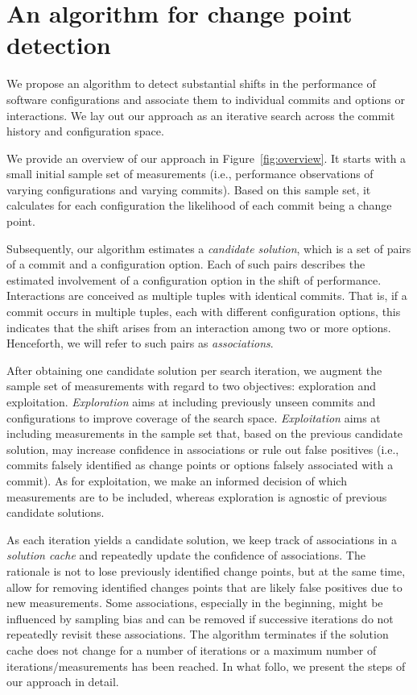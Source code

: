 \documentclass[sigconf, screen]{acmart}
\begin{document}
	\section{An algorithm for change point detection}\label{sec:cpmodel}
	We propose an algorithm to detect substantial shifts in the performance of software configurations and associate them to individual commits and options or interactions. We lay out our approach as an iterative search across the commit history and configuration space. 
	
	We provide an overview of our approach in Figure~\ref{fig:overview}. 
	It starts with a small initial sample set of measurements (i.e., performance observations of varying configurations and varying commits). 
	Based on this sample set, it calculates for each configuration the likelihood of each commit being a change point. 
	
	Subsequently, our algorithm estimates a \emph{candidate solution}, which is a set of pairs of a commit and a configuration option. 
	Each of such pairs describes the estimated involvement of a configuration option in the shift of performance. 
	Interactions are conceived as multiple tuples with identical commits. That is, if a commit occurs in multiple tuples, each with different configuration options, this indicates that the shift arises from an interaction among two or more options. 
	Henceforth, we will refer to such pairs as \emph{associations}.
	
	After obtaining one candidate solution per search iteration, we augment the sample set of measurements with regard to two objectives: exploration and exploitation. 
	\emph{Exploration} aims at including previously unseen commits and configurations to improve coverage of the search space. 
	\emph{Exploitation} aims at including measurements in the sample set that, based on the previous candidate solution, may increase confidence in associations or rule out false positives (i.e., commits falsely identified as change points or options falsely associated with a commit). 
	As for exploitation, we make an informed decision of which measurements are to be included, whereas exploration is agnostic of previous candidate solutions.
	
	As each iteration yields a candidate solution, we keep track of associations in a \emph{solution cache} and repeatedly update the confidence of associations. 
	The rationale is not to lose previously identified change points, but at the same time, allow for removing identified changes points that are likely false positives due to new measurements.
	Some associations, especially in the beginning, might be influenced by sampling bias and can be removed if successive iterations do not repeatedly revisit these associations. 
	The algorithm terminates if the solution cache does not change for a number of iterations or a maximum number of iterations/measurements has been reached.
	In what follo, we present the steps of our approach in detail. 
	
\end{document}
